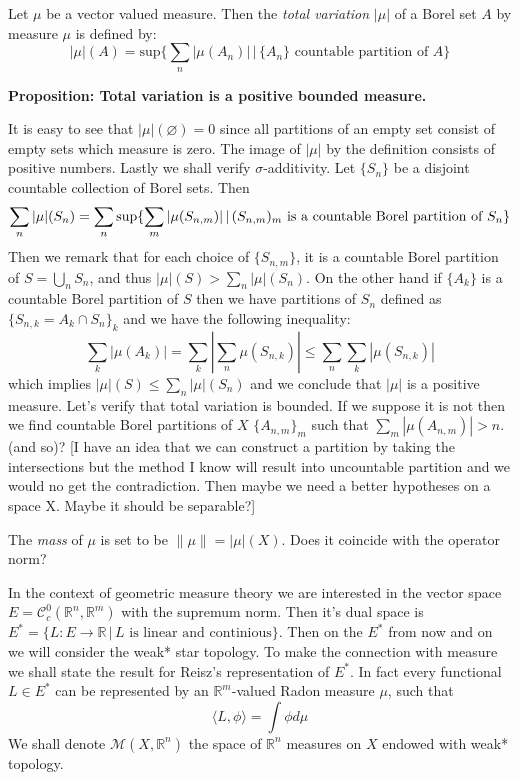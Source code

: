 \documentclass{article}
\begin{document}
\vspace{1ex} Let $\mu$ be a vector valued measure. Then the \emph{total
variation} $|\mu|$ of a Borel set $A$  by measure $\mu$ is defined by:
\[|\mu|(A) = \text{sup}\{\sum_n|\mu(A_n)|\,|\,\{A_n\}\text{ countable partition of }A\}\]

\textbf{Proposition: Total variation is a positive bounded measure.}

\vspace{1ex}
It is easy to see that $|\mu|(\varnothing)=0$ since all partitions of an empty
set consist of empty sets which measure is zero. The image of $|\mu|$ by the
definition consists of positive numbers. Lastly we shall verify $\sigma$-additivity.
Let $\{S_n\}$ be a disjoint countable collection of Borel sets. Then
\[ 
    \sum_n|\mu|(S_n) = \sum_n\sup\{\sum_m|\mu(S_{n,m})|\,|\,(S_{n,m})_m\text{ is a countable Borel partition of }S_n\} \\ 
\]
Then we remark that for each choice of $\{S_{n,m}\}$, it is a countable Borel
partition of $S=\bigcup_n S_n$, and thus $|\mu|(S)>\sum_n|\mu|(S_n)$. On the
other hand if $\{A_k\}$ is a countable Borel partition of $S$ then we have
partitions of $S_n$ defined as $\{S_{n,k}=A_k\cap S_n\}_k$ and we have the
following inequality:
\[
    \sum_k|\mu(A_k)|=\sum_k|\sum_n\mu(S_{n,k})|\leq\sum_n\sum_k|\mu(S_{n,k})|
\]
which implies $|\mu|(S)\leq\sum_n|\mu|(S_n)$ and we conclude that $|\mu|$ is a
positive measure. Let's verify that total variation is bounded. If we suppose it
is not then we find countable Borel partitions of $X$ $\{A_{n, m}\}_m$ such
that $\sum_m|\mu(A_{n,m})| > n$. (and so)? [I have an idea that we can
construct a partition by taking the intersections but the method I know will
result into uncountable partition and we would no get the contradiction. Then
maybe we need a better hypotheses on a space X.  Maybe it should be separable?]

\vspace{1ex}
The \emph{mass} of $\mu$ is set to be $\|\mu\|=|\mu|(X)$. Does it coincide with
the operator norm?

\vspace{1ex}
In the context of geometric measure theory we are interested in the vector
space $E=\mathcal{C}^0_c(\mathbb{R}^n, \mathbb{R}^m)$ with the supremum norm.
Then it's dual space is $E^*=\{L:E\rightarrow\mathbb{R}\,|\,L\text{ is linear
and continious}\}$. Then on the $E^*$ from now and on we will consider the weak*
star topology. To make the connection with measure we shall state the result for
Reisz's representation of $E^*$. In fact every functional $L\in E^*$ can be
represented by an $\mathbb{R}^m$-valued Radon measure $\mu$, such that
\[\langle L,\phi\rangle=\int\phi d\mu\]
We shall denote $\mathcal{M}(X,\mathbb{R}^n)$ the space of $\mathbb{R}^n$
measures on $X$ endowed with weak* topology.
\end{document}
